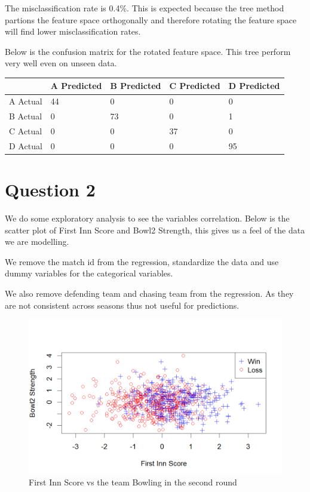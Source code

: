 \documentclass[
]{article}
\begin{document}
The misclassification rate is 0.4\%. This is expected because the tree
method partions the feature space orthogonally and therefore rotating
the feature space will find lower misclassification rates.

Below is the confusion matrix for the rotated feature space. This tree
perform very well even on unseen data.

\begin{longtable}[]{@{}lllll@{}}
\toprule\noalign{}
& A Predicted & B Predicted & C Predicted & D Predicted \\
\midrule\noalign{}
\endhead
\bottomrule\noalign{}
\endlastfoot
A Actual & 44 & 0 & 0 & 0 \\
B Actual & 0 & 73 & 0 & 1 \\
C Actual & 0 & 0 & 37 & 0 \\
D Actual & 0 & 0 & 0 & 95 \\
\end{longtable}

\hypertarget{question-2}{%
\section{Question 2}\label{question-2}}

We do some exploratory analysis to see the variables correlation. Below
is the scatter plot of First Inn Score and Bowl2 Strength, this gives us
a feel of the data we are modelling.

We remove the match id from the regression, standardize the data and use
dummy variables for the categorical variables.

We also remove defending team and chasing team from the regression. As
they are not consistent across seasons thus not useful for predictions.

\begin{figure}
\centering
\includegraphics[width=4.63542in,height=\textheight]{scatter_first_innsscore.png}
\caption{First Inn Score vs the team Bowling in the second round}
\end{figure}
\end{document}
